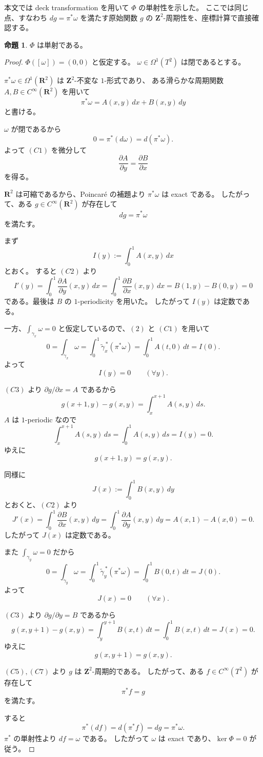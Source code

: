 \documentclass[uplatex,dvipdfmx,11pt]{jsarticle}
\newcommand{\R}{\mathbf{R}}
\newcommand{\Z}{\mathbf{Z}}
\theoremstyle{definition}
\newtheorem{prop}{命題}
\begin{document}
本文では deck transformation を用いて \(\Phi\) の単射性を示した。
ここでは同じ点、すなわち \(dg=\pi^*\omega\) を満たす原始関数 \(g\) の
\(\Z^2\)-周期性を、座標計算で直接確認する。

\begin{prop}
\(\Phi\) は単射である。
\end{prop}

\begin{proof}
\(\Phi([\omega])=(0,0)\) と仮定する。
\(\omega\in\Omega^1(T^2)\) は閉であるとする。

\(\pi^*\omega\in \Omega^1(\R^2)\) は \(\Z^2\)-不変な $1$-形式であり、
ある滑らかな周期関数 \(A,B\in C^\infty(\R^2)\) を用いて
\[
\pi^*\omega=A(x,y)\,dx+B(x,y)\,dy
\tag{C1}
\]
と書ける。

\(\omega\) が閉であるから
\[
0=\pi^*(d\omega)=d(\pi^*\omega).
\]
よって \((C1)\) を微分して
\[
\frac{\partial A}{\partial y}=\frac{\partial B}{\partial x}
\tag{C2}
\]
を得る。

\(\R^2\) は可縮であるから、Poincar\'e の補題より \(\pi^*\omega\) は exact である。
したがって、ある \(g\in C^\infty(\R^2)\) が存在して
\[
dg=\pi^*\omega
\tag{C3}
\]
を満たす。

まず
\[
I(y):=\int_0^1 A(x,y)\,dx
\]
とおく。
すると \((C2)\) より
\[
I'(y)
=
\int_0^1 \frac{\partial A}{\partial y}(x,y)\,dx
=
\int_0^1 \frac{\partial B}{\partial x}(x,y)\,dx
=
B(1,y)-B(0,y)=0
\]
である。最後は \(B\) の \(1\)-periodicity を用いた。
したがって \(I(y)\) は定数である。

一方、\(\int_{\gamma_x}\omega=0\) と仮定しているので、\((2)\) と \((C1)\) を用いて
\[
0=\int_{\gamma_x}\omega
=\int_0^1 \widetilde{\gamma}_x^{\,*}(\pi^*\omega)
=\int_0^1 A(t,0)\,dt
=I(0).
\]
よって
\[
I(y)=0\qquad (\forall y).
\tag{C4}
\]

\((C3)\) より \(\partial g/\partial x=A\) であるから
\[
g(x+1,y)-g(x,y)
=
\int_x^{x+1} A(s,y)\,ds.
\]
\(A\) は \(1\)-periodic なので
\[
\int_x^{x+1} A(s,y)\,ds
=
\int_0^1 A(s,y)\,ds
=
I(y)=0.
\]
ゆえに
\[
g(x+1,y)=g(x,y).
\tag{C5}
\]

\medskip

同様に
\[
J(x):=\int_0^1 B(x,y)\,dy
\]
とおくと、\((C2)\) より
\[
J'(x)
=
\int_0^1 \frac{\partial B}{\partial x}(x,y)\,dy
=
\int_0^1 \frac{\partial A}{\partial y}(x,y)\,dy
=
A(x,1)-A(x,0)=0.
\]
したがって \(J(x)\) は定数である。

また \(\int_{\gamma_y}\omega=0\) だから
\[
0=\int_{\gamma_y}\omega
=\int_0^1 \widetilde{\gamma}_y^{\,*}(\pi^*\omega)
=\int_0^1 B(0,t)\,dt
=J(0).
\]
よって
\[
J(x)=0\qquad (\forall x).
\tag{C6}
\]

\((C3)\) より \(\partial g/\partial y=B\) であるから
\[
g(x,y+1)-g(x,y)
=
\int_y^{y+1} B(x,t)\,dt
=
\int_0^1 B(x,t)\,dt
=
J(x)=0.
\]
ゆえに
\[
g(x,y+1)=g(x,y).
\tag{C7}
\]

\((C5),(C7)\) より \(g\) は \(\Z^2\)-周期的である。
したがって、ある \(f\in C^\infty(T^2)\) が存在して
\[
\pi^*f=g
\]
を満たす。

すると
\[
\pi^*(df)=d(\pi^*f)=dg=\pi^*\omega.
\]
\(\pi^*\) の単射性より \(df=\omega\) である。
したがって \(\omega\) は exact であり、\(\ker\Phi=0\) が従う。
\end{proof}
\end{document}
